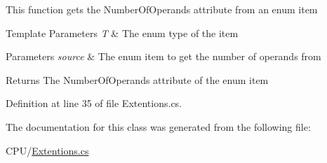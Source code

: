 This function gets the Number\+Of\+Operands attribute from an enum item 


\begin{DoxyTemplParams}{Template Parameters}
{\em T} & The enum type of the item\\
\hline
\end{DoxyTemplParams}

\begin{DoxyParams}{Parameters}
{\em source} & The enum item to get the number of operands from\\
\hline
\end{DoxyParams}
\begin{DoxyReturn}{Returns}
The Number\+Of\+Operands attribute of the enum item 
\end{DoxyReturn}


Definition at line 35 of file Extentions.\+cs.



The documentation for this class was generated from the following file\+:\begin{DoxyCompactItemize}
\item 
C\+P\+U/\hyperlink{_extentions_8cs}{Extentions.\+cs}\end{DoxyCompactItemize}
